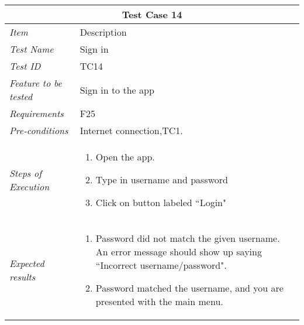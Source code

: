%
\begin{minipage}{\linewidth}
\setlength{\tabcolsep}{15pt}
\centering
{}
\begin{tabular}{ |l|p{70mm}| }
	\hline
	\multicolumn{2}{|c|}{\cellcolor{gray!25} \textbf{Test Case 14}} \\
	\hline
	\it{\cellcolor{gray!25}Item} & {\cellcolor{gray!25} Description } \\
	\hline
	\it{\cellcolor{gray!25}Test Name } & Sign in \\ \hline
	\it{\cellcolor{gray!25}Test ID} & TC14 \\ \hline
	\it{\cellcolor{gray!25}Feature to be tested} & Sign in to the app \\ \hline
	\it{\cellcolor{gray!25}Requirements} & F25  \\ \hline
	\it{\cellcolor{gray!25}Pre-conditions} & Internet connection,TC1. \\ \hline
	\it{\cellcolor{gray!25}Steps of Execution} & \begin{enumerate}
	                                       \item Open the app.
	                                       \item Type in username and password
	                                       \item Click on button labeled ``Login"
	                                     \end{enumerate} \\ \hline
	\it{\cellcolor{gray!25}Expected results} & \begin{enumerate}[label=\alph*)]
	                                       \item Password did not match the given username. An error message should show up saying ``Incorrect username/password".
	                                       \item Password matched the username, and you are presented with the main menu.
	                                     \end{enumerate} \\
	\hline
\end{tabular}
\medskip
\end{minipage}
%
